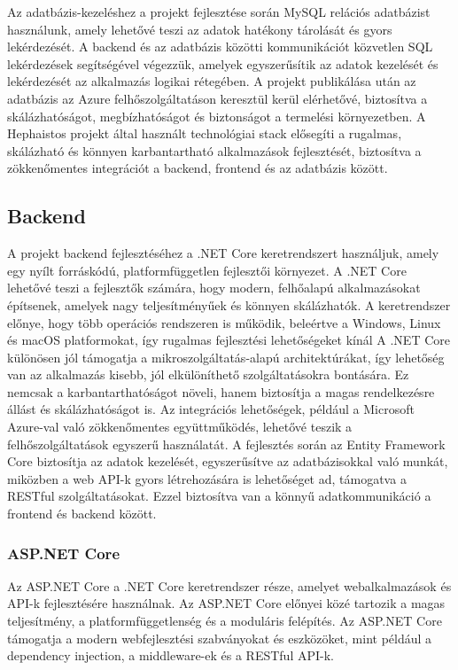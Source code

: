 \documentclass[colorlinks]{thesis-kando}
\theoremstyle{definition}
\theoremstyle{remark}
\begin{document}
Az adatbázis-kezeléshez a projekt fejlesztése során MySQL relációs adatbázist használunk, amely lehetővé teszi az adatok hatékony tárolását és gyors lekérdezését. A backend és az adatbázis közötti kommunikációt közvetlen SQL lekérdezések segítségével végezzük, amelyek egyszerűsítik az adatok kezelését és lekérdezését az alkalmazás logikai rétegében. A projekt publikálása után az adatbázis az Azure felhőszolgáltatáson keresztül kerül elérhetővé, biztosítva a skálázhatóságot, megbízhatóságot és biztonságot a termelési környezetben. A Hephaistos projekt által használt technológiai stack elősegíti a rugalmas, skálázható és könnyen karbantartható alkalmazások fejlesztését, biztosítva a zökkenőmentes integrációt a backend, frontend és az adatbázis között.

\subsection{Backend}
A projekt backend fejlesztéséhez a .NET Core keretrendszert használjuk, amely egy nyílt forráskódú, platformfüggetlen fejlesztői környezet. A .NET Core lehetővé teszi a fejlesztők számára, hogy modern, felhőalapú alkalmazásokat építsenek, amelyek nagy teljesítményűek és könnyen skálázhatók. A keretrendszer előnye, hogy több operációs rendszeren is működik, beleértve a Windows, Linux és macOS platformokat, így rugalmas fejlesztési lehetőségeket kínál A .NET Core különösen jól támogatja a mikroszolgáltatás-alapú architektúrákat, így lehetőség van az alkalmazás kisebb, jól elkülöníthető szolgáltatásokra bontására. Ez nemcsak a karbantarthatóságot növeli, hanem biztosítja a magas rendelkezésre állást és skálázhatóságot is. Az integrációs lehetőségek, például a Microsoft Azure-val való zökkenőmentes együttműködés, lehetővé teszik a felhőszolgáltatások egyszerű használatát. A fejlesztés során az Entity Framework Core biztosítja az adatok kezelését, egyszerűsítve az adatbázisokkal való munkát, miközben a web API-k gyors létrehozására is lehetőséget ad, támogatva a RESTful szolgáltatásokat. Ezzel biztosítva van a könnyű adatkommunikáció a frontend és backend között.

\subsubsection{ASP.NET Core}
Az ASP.NET Core a .NET Core keretrendszer része, amelyet webalkalmazások és API-k fejlesztésére használnak. Az ASP.NET Core előnyei közé tartozik a magas teljesítmény, a platformfüggetlenség és a moduláris felépítés. Az ASP.NET Core támogatja a modern webfejlesztési szabványokat és eszközöket, mint például a dependency injection, a middleware-ek és a RESTful API-k.
\end{document}
